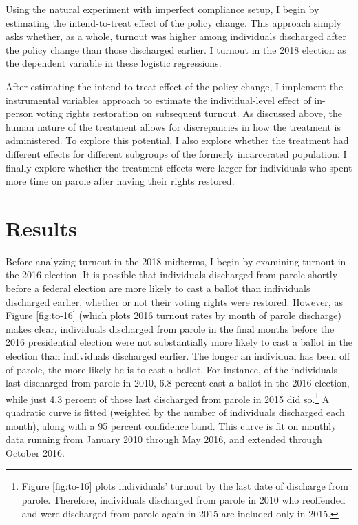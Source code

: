 \documentclass[
  12pt,
]{article}
\begin{document}
Using the natural experiment with imperfect compliance setup, I begin by estimating the intend-to-treat effect of the policy change. This approach simply asks whether, as a whole, turnout was higher among individuals discharged after the policy change than those discharged earlier. I turnout in the 2018 election as the dependent variable in these logistic regressions.

After estimating the intend-to-treat effect of the policy change, I implement the instrumental variables approach to estimate the individual-level effect of in-person voting rights restoration on subsequent turnout. As discussed above, the human nature of the treatment allows for discrepancies in how the treatment is administered. To explore this potential, I also explore whether the treatment had different effects for different subgroups of the formerly incarcerated population. I finally explore whether the treatment effects were larger for individuals who spent more time on parole after having their rights restored.

\hypertarget{results}{%
\section*{Results}\label{results}}

Before analyzing turnout in the 2018 midterms, I begin by examining turnout in the 2016 election. It is possible that individuals discharged from parole shortly before a federal election are more likely to cast a ballot than individuals discharged earlier, whether or not their voting rights were restored. However, as Figure \ref{fig:to-16} (which plots 2016 turnout rates by month of parole discharge) makes clear, individuals discharged from parole in the final months before the 2016 presidential election were not substantially more likely to cast a ballot in the election than individuals discharged earlier. The longer an individual has been off of parole, the more likely he is to cast a ballot. For instance, of the individuals last discharged from parole in 2010, 6.8 percent cast a ballot in the 2016 election, while just 4.3 percent of those last discharged from parole in 2015 did so.\footnote{Figure \ref{fig:to-16} plots individuals' turnout by the last date of discharge from parole. Therefore, individuals discharged from parole in 2010 who reoffended and were discharged from parole again in 2015 are included only in 2015.} A quadratic curve is fitted (weighted by the number of individuals discharged each month), along with a 95 percent confidence band. This curve is fit on monthly data running from January 2010 through May 2016, and extended through October 2016.
\end{document}
